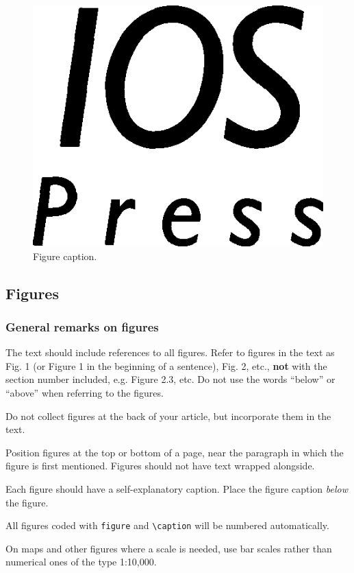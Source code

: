 \documentclass[ds]{iosart2x}
\begin{document}
\begin{figure}[b]
\includegraphics{iospress}
\caption{Figure caption.}
\end{figure}


\subsection{Figures}
\subsubsection{General remarks on figures}
The text should include references to all figures.
Refer to figures in the text as Fig. 1 (or Figure 1 in the beginning of a sentence), Fig. 2, etc., \textbf{not} with the section number included,
e.g. Figure 2.3, etc. Do not use the words ``below'' or ``above'' when referring to the
figures.

Do not collect figures at the back of your article, but incorporate them in the text.

Position figures at the top or bottom of a page, near the paragraph in which the figure is first mentioned.
Figures should not have text wrapped alongside.

Each figure should have a self-explanatory caption. Place the figure caption \textit{below} the figure.

All figures coded with \verb|figure| and \verb|\caption| will be numbered automatically.

On maps and other figures where a scale is needed, use bar scales rather than numerical ones of the type 1:10,000.
\end{document}
